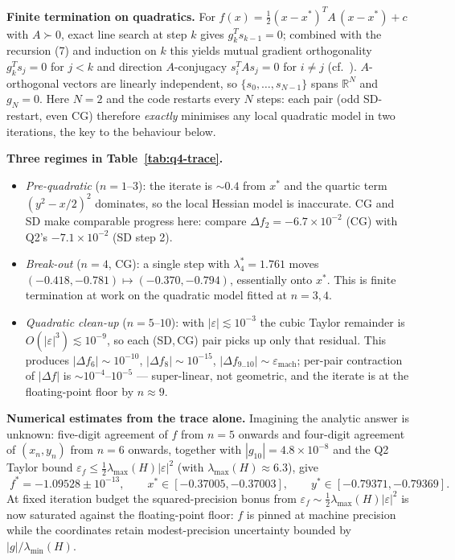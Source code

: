 \documentclass[11pt,a4paper]{article}
\begin{document}
\textbf{Finite termination on quadratics.}
For \(f(x)=\tfrac12(x-x^{*})^{T}\!A\,(x-x^{*})+c\) with \(A\succ 0\), exact line search at step \(k\) gives \(g_k^{T}s_{k-1}=0\); combined with the recursion (7) and induction on \(k\) this yields mutual gradient orthogonality \(g_k^{T}s_j=0\) for \(j<k\) and direction \(A\)-conjugacy \(s_i^{T}\!A s_j=0\) for \(i\ne j\) (cf.~\cite{fletcher-powell}). \(A\)-orthogonal vectors are linearly independent, so \(\{s_0,\dots,s_{N-1}\}\) spans \(\mathbb{R}^{N}\) and \(g_N=0\). Here \(N=2\) and the code restarts every \(N\) steps: each pair (odd SD-restart, even CG) therefore \emph{exactly} minimises any local quadratic model in two iterations, the key to the behaviour below.

\textbf{Three regimes in Table~\ref{tab:q4-trace}.}
\begin{itemize}
\item \emph{Pre-quadratic} (\(n=1\)--\(3\)): the iterate is \(\sim 0.4\) from \(x^{*}\) and the quartic term \((y^{2}-x/2)^{2}\) dominates, so the local Hessian model is inaccurate. CG and SD make comparable progress here: compare \(\Delta f_{2}=-6.7\times 10^{-2}\) (CG) with Q2's \(-7.1\times 10^{-2}\) (SD step 2).
\item \emph{Break-out} (\(n=4\), CG): a single step with \(\lambda^{*}_{4}=1.761\) moves \((-0.418,-0.781)\mapsto(-0.370,-0.794)\), essentially onto \(x^{*}\). This is finite termination at work on the quadratic model fitted at \(n=3,4\).
\item \emph{Quadratic clean-up} (\(n=5\)--\(10\)): with \(|\varepsilon|\lesssim 10^{-3}\) the cubic Taylor remainder is \(O(|\varepsilon|^{3})\lesssim 10^{-9}\), so each (SD,\,CG) pair picks up only that residual. This produces \(|\Delta f_{6}|\sim 10^{-10}\), \(|\Delta f_{8}|\sim 10^{-15}\), \(|\Delta f_{9..10}|\sim\varepsilon_{\text{mach}}\); per-pair contraction of \(|\Delta f|\) is \(\sim 10^{-4}\)--\(10^{-5}\) --- super-linear, not geometric, and the iterate is at the floating-point floor by \(n\!\approx\!9\).
\end{itemize}

\textbf{Numerical estimates from the trace alone.}
Imagining the analytic answer is unknown: five-digit agreement of \(f\) from \(n=5\) onwards and four-digit agreement of \((x_n,y_n)\) from \(n=6\) onwards, together with \(|g_{10}|=4.8\times 10^{-8}\) and the Q2 Taylor bound \(\varepsilon_f\le\tfrac12\lambda_{\max}(H)|\varepsilon|^{2}\) (with \(\lambda_{\max}(H)\approx 6.3\)), give
\[
\boxed{\;f^{*}=-1.09528\pm 10^{-13},\qquad x^{*}\in[-0.37005,-0.37003],\qquad y^{*}\in[-0.79371,-0.79369].\;}
\]
At fixed iteration budget the squared-precision bonus from \(\varepsilon_f\sim\tfrac12\lambda_{\max}(H)|\varepsilon|^{2}\) is now saturated against the floating-point floor: \(f\) is pinned at machine precision while the coordinates retain modest-precision uncertainty bounded by \(|g|/\lambda_{\min}(H)\).
\end{document}
